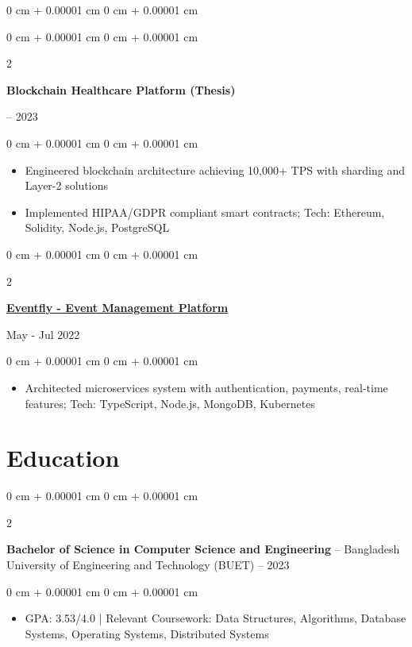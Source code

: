 \documentclass[10pt, letterpaper]{article}
\newenvironment{highlights}{
    \begin{itemize}[
        topsep=0.05 cm,
        parsep=0.05 cm,
        partopsep=0pt,
        itemsep=0pt,
        leftmargin=0 cm + 10pt
    ]
}{
    \end{itemize}
} %
\newenvironment{onecolentry}{
    \begin{adjustwidth}{
        0 cm + 0.00001 cm
    }{
        0 cm + 0.00001 cm
    }
}{
    \end{adjustwidth}
} %
\newenvironment{twocolentry}[2][]{
    \onecolentry
    \def\secondColumn{#2}
    \setcolumnwidth{\fill, 4.5 cm}
    \begin{paracol}{2}
}{
    \switchcolumn \raggedleft \secondColumn
    \end{paracol}
    \endonecolentry
} %
\begin{document}
\begin{onecolentry}
        \begin{twocolentry}{
            2022 – 2023
        }
            \textbf{Blockchain Healthcare Platform (Thesis)}
        \end{twocolentry}
        \begin{onecolentry}
            \begin{highlights}
                \item Engineered blockchain architecture achieving 10,000+ TPS with sharding and Layer-2 solutions
                \item Implemented HIPAA/GDPR compliant smart contracts; Tech: Ethereum, Solidity, Node.js, PostgreSQL
            \end{highlights}
        \end{onecolentry}

        \begin{twocolentry}{
            May - Jul 2022
        }
            \href{https://github.com/eventfly/Microservices}{\textbf{Eventfly - Event Management Platform}}
        \end{twocolentry}
        \begin{onecolentry}
            \begin{highlights}
                \item Architected microservices system with authentication, payments, real-time features; Tech: TypeScript, Node.js, MongoDB, Kubernetes
            \end{highlights}
        \end{onecolentry}

    \section{Education}
 
        \begin{twocolentry}{
            2018 – 2023
        }
            \textbf{Bachelor of Science in Computer Science and Engineering} -- Bangladesh University of Engineering and Technology (BUET)\end{twocolentry}
        \begin{onecolentry}
            \begin{highlights}
                \item GPA: 3.53/4.0 | Relevant Coursework: Data Structures, Algorithms, Database Systems, Operating Systems, Distributed Systems
            \end{highlights}
        \end{onecolentry}


\end{onecolentry}
\end{document}
